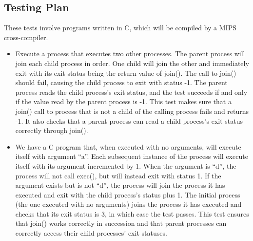 \subsection{Testing Plan}
These tests involve programs written in C, which will be compiled by a MIPS cross-compiler.
\begin{itemize}
    \item Execute a process that executes two other processes. The parent process will join each child process in order. One child will join the other and immediately exit with its exit status being the return value of {\ttfamily join()}. The call to {\ttfamily join()} should fail, causing the child process to exit with status -1. The parent process reads the child process's exit status, and the test succeeds if and only if the value read by the parent process is -1. This test makes sure that a {\ttfamily join()} call to process that is not a child of the calling process fails and returns -1. It also checks that a parent process can read a child process's exit status correctly through {\ttfamily join()}.
    \item We have a C program that, when executed with no arguments, will execute itself with argument ``a''. Each subsequent instance of the process will execute itself with its argument incremented by 1. When the argument is ``d'', the process will not call {\ttfamily exec()}, but will instead exit with status 1. If the argument exists but is not ``d'', the process will join the process it has executed and exit with the child process's status plus 1. The initial process (the one executed with no arguments) joins the process it has executed and checks that its exit status is 3, in which case the test passes. This test ensures that {\ttfamily join()} works correctly in succession and that parent processes can correctly access their child processes' exit statuses.
\end{itemize}
